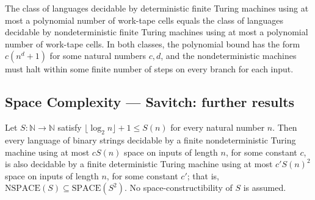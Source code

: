 \begin{theorem}
\label{Complexity.PSPACE_eq_NPSPACE}
\leanok
{}
The class of languages decidable by deterministic finite Turing machines using at most a
polynomial number of work-tape cells equals the class of languages decidable by
nondeterministic finite Turing machines using at most a polynomial number of work-tape
cells. In both classes, the polynomial bound has the form $c(n^d+1)$ for some natural
numbers $c,d$, and the nondeterministic machines must halt within some finite number of
steps on every branch for each input.
\end{theorem}

\subsection*{Space Complexity --- Savitch: further results}

\begin{theorem}
\label{Complexity.savitch_of_logSpace_le}
\leanok
{}
Let $S:\mathbb{N}\to\mathbb{N}$ satisfy $\lfloor\log_2 n\rfloor+1\le S(n)$ for every
natural number $n$. Then every language of binary strings decidable by a finite
nondeterministic Turing machine using at most $cS(n)$ space on inputs of length $n$, for
some constant $c$, is also decidable by a finite deterministic Turing machine using at
most $c'S(n)^2$ space on inputs of length $n$, for some constant $c'$; that is,
$\mathrm{NSPACE}(S)\subseteq\mathrm{SPACE}(S^2)$. No space-constructibility of $S$ is
assumed.
\end{theorem}
